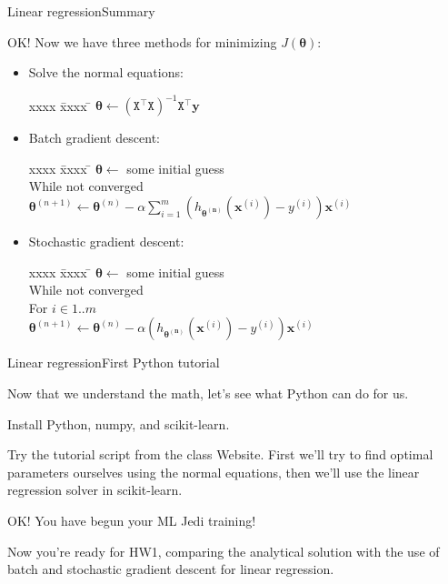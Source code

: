 \documentclass{beamer}
\renewcommand{\vec}[1]{\boldsymbol{#1}}
\newcommand{\mat}[1]{\mathtt{#1}}
\begin{document}
\begin{frame}{Linear regression}{Summary}

  OK! Now we have three methods for minimizing $J(\vec{\theta})$:
  \begin{itemize}
  \item Solve the \alert{normal equations}:
    \begin{tabbing}
      xxxx \= xxxx \= \kill
      $\vec{\theta} \leftarrow (\mat{X}^\top \mat{X})^{-1}\mat{X}^\top \vec{y}$
    \end{tabbing}
  \item \alert{Batch} gradient descent:
    \begin{tabbing}
      xxxx \= xxxx \= \kill
      $\vec{\theta} \leftarrow$ some initial guess \\
      While not converged \\
      \> $\vec{\theta}^{(n+1)} \leftarrow \vec{\theta}^{(n)} - \alpha \sum_{i=1}^m (h_{\vec{\theta^{(n)}}}(\vec{x}^{(i)}) - y^{(i)})\vec{x}^{(i)}$ 
    \end{tabbing}
  \item \alert{Stochastic} gradient descent:
    \begin{tabbing}
      xxxx \= xxxx \= \kill
      $\vec{\theta} \leftarrow$ some initial guess \\
      While not converged \\
      \> For $i \in 1..m$ \\
      \> \> $\vec{\theta}^{(n+1)} \leftarrow \vec{\theta}^{(n)} - \alpha (h_{\vec{\theta^{(n)}}}(\vec{x}^{(i)}) - y^{(i)})\vec{x}^{(i)}$
    \end{tabbing}    
  \end{itemize}

\end{frame}


\begin{frame}{Linear regression}{First Python tutorial}

  Now that we understand the math, let's see what Python can do for us.

  \medskip

  Install Python, numpy, and scikit-learn.

  \medskip

  Try the tutorial script from the class Website. First we'll try to
  find optimal parameters ourselves using the normal equations, then
  we'll use the linear regression solver in scikit-learn.

  \medskip

  OK! You have begun your ML Jedi training!

  \medskip

  Now you're ready for HW1, comparing the analytical solution with the
  use of batch and stochastic gradient descent for linear regression.

\end{frame}
\end{document}
